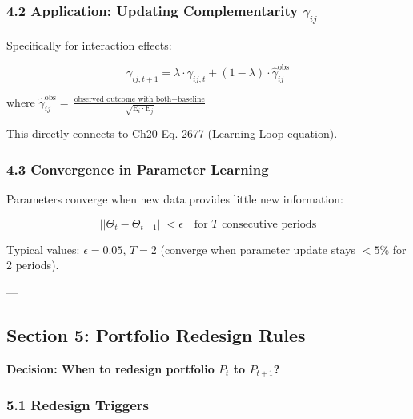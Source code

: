 \subsubsection*{4.2 Application: Updating Complementarity $\gamma_{ij}$}

Specifically for interaction effects:

\begin{equation}
\gamma_{ij,t+1} = \lambda \cdot \gamma_{ij,t} + (1-\lambda) \cdot \hat{\gamma}_{ij}^{\text{obs}}
\label{eq:kkk-gamma-update}
\end{equation}

where $\hat{\gamma}_{ij}^{\text{obs}} = \frac{\text{observed outcome with both} - \text{baseline}}{\sqrt{\text{E}_i \cdot \text{E}_j}}$

This directly connects to Ch20 Eq. 2677 (Learning Loop equation).

\subsubsection*{4.3 Convergence in Parameter Learning}

Parameters converge when new data provides little new information:

\begin{equation}
||\Theta_t - \Theta_{t-1}|| < \epsilon \quad \text{for } T \text{ consecutive periods}
\label{eq:kkk-convergence-param}
\end{equation}

Typical values: $\epsilon = 0.05$, $T = 2$ (converge when parameter update stays $< 5\%$ for 2 periods).

---

\subsection*{Section 5: Portfolio Redesign Rules}
\label{sec:kkk-redesign}

\textbf{Decision: When to redesign portfolio $P_t$ to $P_{t+1}$?}

\subsubsection*{5.1 Redesign Triggers}

